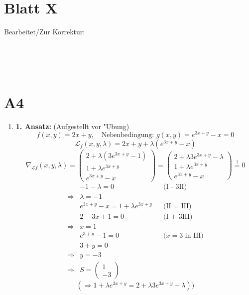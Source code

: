 \documentclass[fleqn,12pt]{scrartcl}
\begin{document}
	\section*{Blatt X}
	Bearbeitet/Zur Korrektur:

	\noindent
	\begin{Form}
		\\
		\\
		\\
	\end{Form}

	\section*{A4}
	\begin{enumerate}

		\item
			\textbf{1. Ansatz:} (Aufgestellt vor "Ubung)
			\begin{equation*}
				f(x,y) = 2x + y,\quad \text{Nebenbedingung: } g(x,y) = e^{3x+y} - x = 0
			\end{equation*}
			\begin{equation*}
				\mathcal{L}_f(x,y, \lambda) =
				2x + y +
				\lambda(e^{3x+y} - x)
			\end{equation*}
			\begin{equation*}
				\nabla_{\mathcal{L}f}(x,y,\lambda) =
				\begin{pmatrix}
					2 + \lambda(3e^{3x+y} - 1)\\
					1 + \lambda e^{3x+y}\\
					e^{3x+y} - x
				\end{pmatrix}
				= \begin{pmatrix}
					2 + \lambda3e^{3x+y} - \lambda\\
					1 + \lambda e^{3x+y}\\
					e^{3x+y} - x
				\end{pmatrix}
				\overset!= 0
			\end{equation*}
			\begin{align*}
				& -1 - \lambda = 0 && \text{(I - 3II)} \\
				\Rightarrow& \lambda = -1  && \\
									& e^{3x+y} - x = 1 + \lambda e^{3x+y} && \text{(II = III)}\\
										& 2 -3x + 1 = 0 && \text{(I + 3III)} \\
				\Rightarrow& x = 1 && \\
													& e^{3+y} - 1 = 0 && \text{($x=3$ in III)} \\
								& 3+y = 0 &&\\
				\Rightarrow& y = -3 &&\\
			\Rightarrow& S = \begin{pmatrix}1 \\ -3\end{pmatrix} &&
			\end{align*}
			\begin{equation*}
				(\Rightarrow 1 + \lambda e^{3x+y} = 2 + \lambda 3e^{3x+y} - \lambda))
			\end{equation*}


\end{enumerate}
\end{document}
